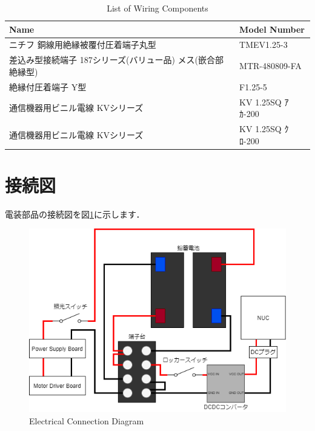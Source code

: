 \documentclass[{../../master}]{subfiles}
\begin{document}
  \begin{table}[ht]
    \begin{center}
      \begin{tabular}{|l|l|}
        \hline
        Name & Model Number \\ \hline
        ニチフ 銅線用絶縁被覆付圧着端子丸型 & TMEV1.25-3 \\ \hline
        差込み型接続端子 187シリーズ(バリュー品) メス(嵌合部絶縁型) & MTR-480809-FA \\ \hline
        絶縁付圧着端子 Y型 & F1.25-5 \\ \hline
        通信機器用ビニル電線 KVシリーズ & KV 1.25SQ ｱｶ-200 \\ \hline
        通信機器用ビニル電線 KVシリーズ & KV 1.25SQ ｸﾛ-200 \\ \hline
      \end{tabular}
    \end{center}
    \caption{List of Wiring Components}
    \label{tab:list_of_wiring_components}
  \end{table}

  \section{接続図}

  電装部品の接続図を図\ref{fig:electrical_connection_diagram}に示します．

  \begin{figure}[ht]
    \centering
    \includegraphics[width=100truemm, clip]{images/electrical_connections.png}
    \caption{Electrical Connection Diagram}
    \label{fig:electrical_connection_diagram}
  \end{figure}
\end{document}
